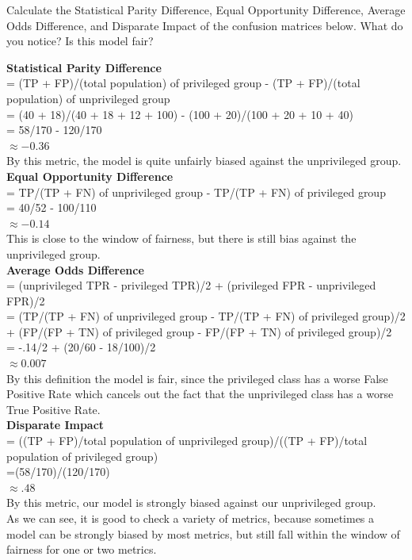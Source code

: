 \documentclass[assignment03_Solutions]{subfiles}
\begin{document}
\begin{exercise}[(40 Minutes)]
\bes
\item Calculate the Statistical Parity Difference, Equal Opportunity Difference, Average Odds Difference, and Disparate Impact of the confusion matrices below. What do you notice? Is this model fair?



\begin{boxedsolution}
\textbf{Statistical Parity Difference}\\
= (TP + FP)/(total population) of privileged group - (TP + FP)/(total population) of unprivileged group\\
=  (40 + 18)/(40 + 18 + 12 + 100) - (100 + 20)/(100 + 20 + 10 + 40)\\
= 58/170 - 120/170\\
$\approx -0.36$\\
By this metric, the model is quite unfairly biased against the unprivileged group.\\
\textbf{Equal Opportunity Difference}\\
= TP/(TP + FN) of unprivileged group - TP/(TP + FN) of privileged group\\
= 40/52 - 100/110\\
$\approx -0.14$\\
This is close to the window of fairness, but there is still bias against the unprivileged group.\\
\textbf{Average Odds Difference}\\
= (unprivileged TPR - privileged TPR)/2 + (privileged FPR - unprivileged FPR)/2\\
= (TP/(TP + FN) of unprivileged group - TP/(TP + FN) of privileged group)/2 + (FP/(FP + TN) of privileged group - FP/(FP + TN) of privileged group)/2\\
= -.14/2 + (20/60 - 18/100)/2\\
$\approx 0.007$\\
By this definition the model is fair, since the privileged class has a worse False Positive Rate which cancels out the fact that the unprivileged class has a worse True Positive Rate.\\
\textbf{Disparate Impact}\\
= ((TP + FP)/total population of unprivileged group)/((TP + FP)/total population of privileged group)\\
=(58/170)/(120/170)\\
$\approx .48$\\
By this metric, our model is strongly biased against our unprivileged group.\\
As we can see, it is good to check a variety of metrics, because sometimes a model can be strongly biased by most metrics, but still fall within the window of fairness for one or two metrics.
\end{boxedsolution}


\end{exercise}
\end{document}
